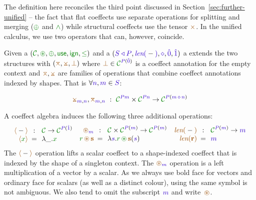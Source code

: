 The definition here reconciles the third point discussed in Section~\ref{sec:further-unified} --
the fact that flat coeffects use separate operations for splitting and merging ($\cpar$ and $\czip$)
while structural coeffects use the tensor $\atimes$. In the unified calculus, we use two operators
that can, however, coincide.

\begin{definition}
Given a  $(\C, \cseq, \cpar, \cunit, \czero, \cleq)$ and a
 $(\SHP, \slen{-}, \stimes, \sempty, \sunit)$ a  extends the two structures with $(\azip, \apar, \azero)$ where $\azero \in \C^{\SP(\sempty)}$
is a coeffect annotation for the empty context and $\azip, \apar$ are families of operations that
combine coeffect annotations indexed by shapes. That is $\forall \sclrd{n},\sclrd{m} \in \SH$:

\begin{equation*}
\apar_{\sclrd{m},\sclrd{n}}, \azip_{\sclrd{m},\sclrd{n}} ~:~ \C^{\SP \sclrd{m}} \times \C^{\SP \sclrd{n}} \rightarrow \C^{\SP (\sclrd{m}\,\stimes\,\sclrd{n})}
\end{equation*}
\end{definition}

\noindent
A coeffect algebra induces the following three additional operations:
%
\begin{equation*}
\begin{array}{rclcrcl}
 \alift{-} &\narrow{:}& \C \rightarrow \C^{\SP(\sunit)}  \\
 \alift{\cclrd{x}} &\narrow{=}& \lambda \_ . \cclrd{x}   \\
\end{array}
\begin{array}{rclcrcl}
 \aseq_{\sclrd{m}} &\narrow{:}&  \C \times \C^{\SP(\sclrd{m})} \rightarrow \C^{\SP(\sclrd{m})}   \\
 \cclrd{r}\, \aseq\, \aclrd{\textbf{s}} &\narrow{=}& \lambda \sclrd{s} . \cclrd{r}\, \cseq\, \aclrd{\textbf{s}}(\sclrd{s}) \\
\end{array}
\begin{array}{rclcrcl}
 \alen{-} &\narrow{:}& \C^{\SP(\sclrd{m})} \rightarrow \sclrd{m}\\
 \alen{\aclrd{\textbf{r}}} &\narrow{=}& \sclrd{m}
\end{array}
\end{equation*}
%
The $\alift{-}$ operation lifts a scalar coeffect to a shape-indexed coeffect that is indexed by
the shape of a singleton context. The $\aseq_{\sclrd{m}}$ operation is a left multiplication of a
vector by a scalar. As we always use bold face for vectors and ordinary face for scalars (as well
as a distinct colour), using the same symbol is not ambiguous. We also tend to omit the subscript
$\sclrd{m}$ and write~$\aseq$.

